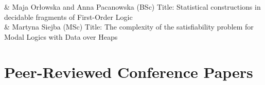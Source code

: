 \documentclass[10pt,a4paper]{article}
\begin{document}
\begin{EntriesTableDuration}
    &
  Maja Orłowska and Anna Pacanowska  (BSc) \newline
  Title: Statistical constructions in decidable fragments of First-Order Logic\\

    &
  Martyna Siejba (MSc) \newline
  Title: The complexity of the satisfiability problem for Modal Logics with Data over Heaps\\
    
\end{EntriesTableDuration}


\section{Peer-Reviewed Conference Papers}
\end{document}
